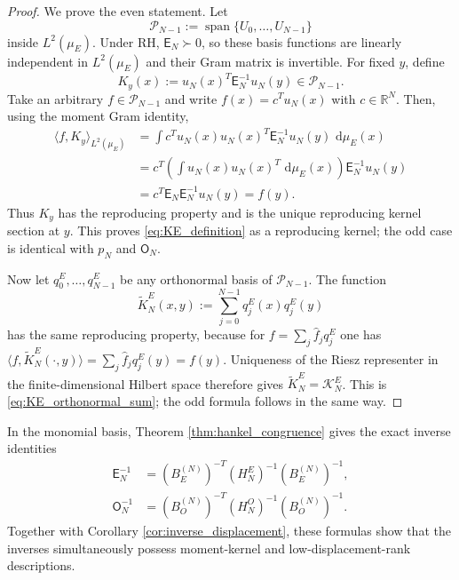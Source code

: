 \documentclass[preprint,12pt]{elsarticle}
\numberwithin{equation}{section}
\theoremstyle{plain}
\theoremstyle{definition}
\theoremstyle{remark}
\newcommand{\RH}{\mathrm{RH}}
\newcommand{\E}{\mathsf E}
\newcommand{\Omat}{\mathsf O}
\newcommand{\dd}{\,\mathrm d}
\begin{document}
\begin{proof}
We prove the even statement.  Let
\begin{equation}
\mathcal P_{N-1}:=\operatorname{span}\{U_0,\ldots,U_{N-1}\}
\end{equation}
inside $L^2(\mu_E)$.  Under $\RH$, $\E_N\succ0$, so these basis functions are linearly independent in $L^2(\mu_E)$ and their Gram matrix is invertible.  For fixed $y$, define
\begin{equation}
K_y(x):=u_N(x)^T\E_N^{-1}u_N(y)\in\mathcal P_{N-1}.
\end{equation}
Take an arbitrary $f\in\mathcal P_{N-1}$ and write $f(x)=c^Tu_N(x)$ with $c\in\mathbb R^N$.  Then, using the moment Gram identity,
\begin{align}
\langle f,K_y\rangle_{L^2(\mu_E)}
&=\int c^Tu_N(x)u_N(x)^T\E_N^{-1}u_N(y)\,\dd\mu_E(x)\\
&=c^T\left(\int u_N(x)u_N(x)^T\,\dd\mu_E(x)\right)\E_N^{-1}u_N(y)\\
&=c^T\E_N\E_N^{-1}u_N(y)=f(y).
\end{align}
Thus $K_y$ has the reproducing property and is the unique reproducing kernel section at $y$.  This proves \eqref{eq:KE_definition} as a reproducing kernel; the odd case is identical with $p_N$ and $\Omat_N$.

Now let $q_0^E,\ldots,q_{N-1}^E$ be any orthonormal basis of $\mathcal P_{N-1}$.  The function
\begin{equation}
\widetilde K_N^E(x,y):=\sum_{j=0}^{N-1}q_j^E(x)q_j^E(y)
\end{equation}
has the same reproducing property, because for
$f=\sum_j\widehat f_jq_j^E$ one has
$\langle f,\widetilde K_N^E(\cdot,y)\rangle=\sum_j\widehat f_jq_j^E(y)=f(y)$.  Uniqueness of the Riesz representer in the finite-dimensional Hilbert space therefore gives
$\widetilde K_N^E=\mathcal K_N^E$.  This is \eqref{eq:KE_orthonormal_sum}; the odd formula follows in the same way.
\end{proof}

In the monomial basis, Theorem \ref{thm:hankel_congruence} gives the exact inverse identities
\begin{align}
\E_N^{-1}
&=(B_E^{(N)})^{-T}(H_N^E)^{-1}(B_E^{(N)})^{-1},
\label{eq:E_inverse_hankel}\\
\Omat_N^{-1}
&=(B_O^{(N)})^{-T}(H_N^O)^{-1}(B_O^{(N)})^{-1}.
\label{eq:O_inverse_hankel}
\end{align}
Together with Corollary \ref{cor:inverse_displacement}, these formulas show that the inverses simultaneously possess moment-kernel and low-displacement-rank descriptions.
\end{document}

